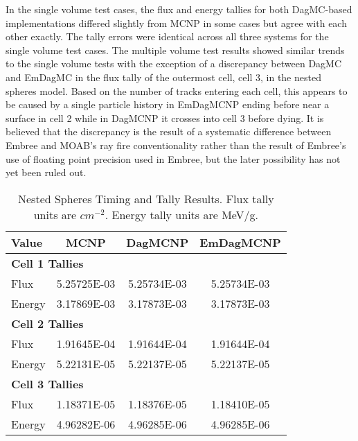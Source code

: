\documentclass{anstrans}
\begin{document}



In the single volume test cases, the flux and energy tallies for both DagMC-based implementations differed slightly from MCNP in some cases but agree with each other exactly. The tally errors were identical across all three systems for the single volume test cases. The multiple volume test results showed similar trends to the single volume tests with the exception of a discrepancy between DagMC and EmDagMC in the flux tally of the outermost cell, cell 3, in the nested spheres model. Based on the number of tracks entering each cell, this appears to be caused by a single particle history in EmDagMCNP ending before near a surface in cell 2 while in DagMCNP it crosses into cell 3 before dying. It is believed that the discrepancy is the result of a systematic difference between Embree and MOAB's ray fire conventionality rather than the result of Embree's use of floating point precision used in Embree, but the later possibility has not yet been ruled out.

\begin{table}

  \begin{center}
    \caption{Nested Spheres Timing and Tally Results. Flux tally units are $cm^{-2}$. Energy tally units are MeV/g.}
    
    \begin{tabular}{lccc}
      \toprule
      Value & MCNP & DagMCNP & EmDagMCNP \\
      \toprule
      \multicolumn{4}{l}{\textbf{Cell 1 Tallies}} \\
      \hline
      Flux  & 5.25725E-03 & 5.25734E-03 & 5.25734E-03 \\
      Energy  & 3.17869E-03 &  3.17873E-03 &  3.17873E-03 \\
      \hline
      \multicolumn{4}{l}{\textbf{Cell 2 Tallies}} \\
      \hline
      Flux  & 1.91645E-04 & 1.91644E-04 & 1.91644E-04 \\
      Energy  & 5.22131E-05 & 5.22137E-05 & 5.22137E-05 \\
      \hline
      \multicolumn{4}{l}{\textbf{Cell 3 Tallies}} \\
      \hline
      Flux  & 1.18371E-05 & 1.18376E-05 & 1.18410E-05 \\
      Energy  & 4.96282E-06 & 4.96285E-06 & 4.96285E-06 \\
      \bottomrule
                        
    \end{tabular}


  \end{center}
\end{table}
\end{document}
